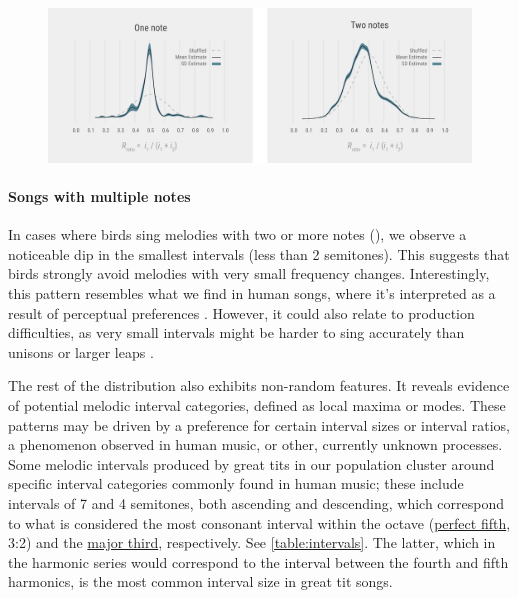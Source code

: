 \begin{figure}[ht!]
    \centering
    \includegraphics[width=\linewidth]{figures/chapter_5/rhythmic-nulls.pdf}
    \label{c5_fig:rhythmic-nulls}
\end{figure}


\paragraph{Songs with multiple notes}
In cases where birds sing melodies with two or more notes (), we observe a noticeable dip in the smallest intervals (less than 2 semitones). This suggests that birds strongly avoid melodies with very small frequency changes. Interestingly, this pattern resembles what we find in human songs, where it's interpreted as a result of perceptual preferences \autocite{bowling2012, kuroyanagi2019}. However, it could also relate to production difficulties, as very small intervals might be harder to sing accurately than unisons or larger leaps \autocite{anglada-tort2023}.

The rest of the distribution also exhibits non-random features. It reveals evidence of potential melodic interval categories, defined as local maxima or modes. These patterns may be driven by a preference for certain interval sizes or interval ratios, a phenomenon observed in human music, or other, currently unknown processes. Some melodic intervals produced by great tits in our population cluster around specific interval categories commonly found in human music; these include intervals of 7 and 4 semitones, both ascending and descending, which correspond to what is considered the most consonant interval within the octave (\href{https://en.wikipedia.org/wiki/Perfect_fifth}{perfect fifth}, 3:2) and the \href{https://upload.wikimedia.org/wikipedia/commons/transcoded/2/2a/Just_major_third_on_C.mid/Just_major_third_on_C.mid.mp3}{major third}, respectively. See \autoref{table:intervals}. The latter, which in the harmonic series would correspond to the interval between the fourth and fifth harmonics, is the most common interval size in great tit songs.

